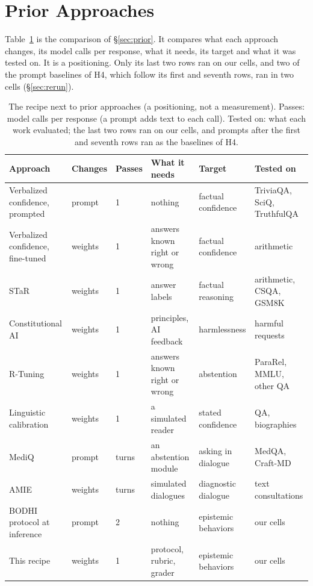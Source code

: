 \documentclass{article}
\newcommand{\bodhi}{BODHI}
\begin{document}
\section{Prior Approaches}
\label{app:prior}

Table~\ref{tab:prior} is the comparison of \S\ref{sec:prior}. It compares what each approach changes,
its model calls per response, what it needs, its target and what it was tested on. It is a
positioning. Only its last two rows ran on our cells, and two of the prompt baselines of H4, which
follow its first and seventh rows, ran in two cells (\S\ref{sec:rerun}).

\begin{table}[!ht]
\centering
\caption{The recipe next to prior approaches (a positioning, not a measurement). Passes: model calls
per response (a prompt adds text to each call). Tested on: what each work evaluated; the last two
rows ran on our cells, and prompts after the first and seventh rows ran as the baselines of H4.}
\label{tab:prior}
\scriptsize
\setlength{\tabcolsep}{2pt}
\begin{tabular}{llllll}
\toprule
Approach & Changes & Passes & What it needs & Target & Tested on \\
\midrule
Verbalized confidence, prompted \citep{tian2023just} & prompt & 1 & nothing & factual confidence & TriviaQA, SciQ, TruthfulQA \\
Verbalized confidence, fine-tuned \citep{lin2022teaching} & weights & 1 & answers known right or wrong & factual confidence & arithmetic \\
STaR \citep{zelikman2022star} & weights & 1 & answer labels & factual reasoning & arithmetic, CSQA, GSM8K \\
Constitutional AI \citep{bai2022constitutional} & weights & 1 & principles, AI feedback & harmlessness & harmful requests \\
R-Tuning \citep{zhang2024rtuning} & weights & 1 & answers known right or wrong & abstention & ParaRel, MMLU, other QA \\
Linguistic calibration \citep{band2024linguistic} & weights & 1 & a simulated reader & stated confidence & QA, biographies \\
MediQ \citep{li2024mediq} & prompt & turns & an abstention module & asking in dialogue & MedQA, Craft-MD \\
AMIE \citep{tu2025amie} & weights & turns & simulated dialogues & diagnostic dialogue & text consultations \\
\bodhi{} protocol at inference & prompt & 2 & nothing & epistemic behaviors & our cells \\
This recipe & weights & 1 & protocol, rubric, grader & epistemic behaviors & our cells \\
\bottomrule
\end{tabular}
\end{table}
\end{document}
